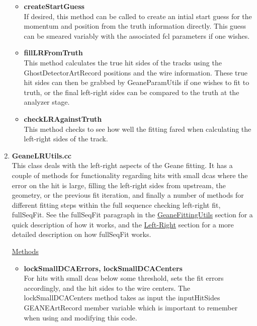 \begin{enumerate}
\begin{itemize}
          \item{\bf{createStartGuess}} \\
          If desired, this method can be called to create an intial start guess for the momentum and position from the truth information directly. This guess can be smeared variably with the associated fcl parameters if one wishes.

          \item{\bf{fillLRFromTruth}} \\
          This method calculates the true hit sides of the tracks using the GhostDetectorArtRecord positions and the wire information. These true hit sides can then be grabbed by GeaneParamUtils if one wishes to fit to truth, or the final left-right sides can be compared to the truth at the analyzer stage.

          \item{\bf{checkLRAgainstTruth}} \\
          This method checks to see how well the fitting fared when calculating the left-right sides of the track.


        \end{itemize}

      \item{\bf{GeaneLRUtils.cc}} \\
      \label{sec:GeaneLRUtils}
      This class deals with the left-right aspects of the Geane fitting. It has a couple of methods for functionality regarding hits with small dcas where the error on the hit is large, filling the left-right sides from upstream, the geometry, or the previous fit iteration, and finally a number of methods for different fitting steps within the full sequence checking left-right fit, fullSeqFit. See the fullSeqFit paragraph in the \hyperref[sec:GeaneFittingUtils]{GeaneFittingUtils} section for a quick description of how it works, and the \hyperref[sec:LR]{Left-Right} section for a more detailed description on how fullSeqFit works.

      \underline{Methods}

        \begin{itemize}

          \item{\bf{lockSmallDCAErrors, lockSmallDCACenters}} \\
          For hits with small dcas below some threshold, sets the fit errors accordingly, and the hit sides to the wire centers. The lockSmallDCACenters method takes as input the inputHitSides GEANEArtRecord member variable which is important to remember when using and modifying this code.


\end{itemize}
\end{enumerate}
